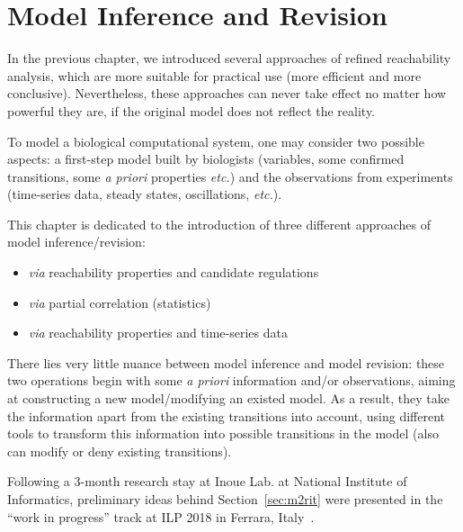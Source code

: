 \chapter{Model Inference and Revision}\label{chap:modelInference}
\begin{mybox}
In the previous chapter, we introduced several approaches of refined reachability analysis, which are more suitable for practical use (more efficient and more conclusive).
Nevertheless, these approaches can never take effect no matter how powerful they are, if the original model does not reflect the reality.

To model a biological computational system, one may consider two possible aspects: a first-step model built by biologists (variables, some confirmed transitions, some \textit{a priori} properties \textit{etc.}) and the observations from experiments (time-series data, steady states, oscillations, \textit{etc.}).

This chapter is dedicated to the introduction of three different approaches of model inference/revision:

\begin{itemize}
    \item \textit{via} reachability properties and candidate regulations
    \item \textit{via} partial correlation (statistics)
    \item \textit{via} reachability properties and time-series data
\end{itemize}

There lies very little nuance between model inference and model revision: these two operations begin with some \textit{a priori} information and/or observations, aiming at constructing a new model/modifying an existed model.
As a result, they take the information apart from the existing transitions into account, using different tools to transform this information into possible transitions in the model (also can modify or deny existing transitions).

Following a 3-month research stay at Inoue Lab. at National Institute of Informatics, preliminary ideas behind Section~\ref{sec:m2rit} were presented in the ``work in progress'' track at ILP 2018 in Ferrara, Italy~\cite{chai2018using}.
\end{mybox}

